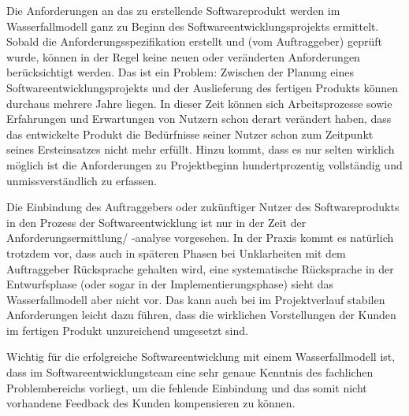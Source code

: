 Die Anforderungen an das zu erstellende Softwareprodukt werden im Wasserfall\-modell ganz zu Beginn des Softwareentwicklungsprojekts ermittelt. Sobald die Anforderungsspezifikation 
erstellt und (vom Auftraggeber) geprüft wurde, können in der Regel keine neuen oder veränderten Anforderungen berücksichtigt werden. Das ist ein Problem: Zwischen der Planung eines Softwareentwicklungsprojekts und der Auslieferung des fertigen Produkts können durchaus mehrere Jahre liegen. In dieser Zeit können sich Arbeitsprozesse sowie Erfahrungen und Erwartungen von Nutzern schon derart verändert haben, dass das entwickelte Produkt die Bedürfnisse seiner Nutzer schon zum Zeitpunkt seines Ersteinsatzes nicht mehr erfüllt. Hinzu kommt, dass es nur selten wirklich möglich ist die Anforderungen zu Projektbeginn hundertprozentig vollständig und unmissverständlich zu erfassen.

\vspace{2mm}



Die Einbindung des Auftraggebers oder zukünftiger Nutzer des Softwareprodukts in den Prozess der Softwareentwicklung ist nur in der Zeit der Anforderungsermittlung/
\linebreak %
-analyse vorgesehen. In der Praxis kommt es natürlich trotzdem vor, dass auch in späteren Phasen bei Unklarheiten mit dem Auftraggeber Rücksprache gehalten wird, eine systematische Rücksprache in der Entwurfsphase (oder sogar in der Implementierungsphase) sieht das Wasserfallmodell aber nicht vor. Das kann auch bei im Projektverlauf stabilen Anforderungen leicht dazu führen, dass die wirklichen Vorstellungen der Kunden im fertigen Produkt unzureichend umgesetzt sind.

Wichtig für die erfolgreiche Softwareentwicklung mit einem Wasserfallmodell ist, dass im Softwareentwicklungsteam eine sehr genaue Kenntnis des fachlichen Problembereichs vorliegt, um die fehlende Einbindung und das somit nicht vorhandene Feedback des Kunden kompensieren zu können.

\vspace{2mm} %

